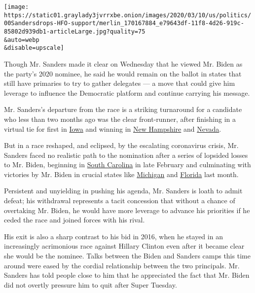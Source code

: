 \texttt{[image: https://static01.graylady3jvrrxbe.onion/images/2020/03/10/us/politics/00Sandersdrops-HFO-support/merlin\_170167884\_e79643df-11f8-4d26-919c-85802d939db1-articleLarge.jpg?quality=75\\\&auto=webp\\\&disable=upscale]}

Though Mr. Sanders made it clear on Wednesday that he viewed Mr. Biden
as the party's 2020 nominee, he said he would remain on the ballot in
states that still have primaries to try to gather delegates --- a move
that could give him leverage to influence the Democratic platform and
continue carrying his message.

Mr. Sanders's departure from the race is a striking turnaround for a
candidate who less than two months ago was the clear front-runner, after
finishing in a virtual tie for first in
\href{https://www.nytimes3xbfgragh.onion/2020/02/07/us/politics/who-won-iowa-caucuses.html}{Iowa}
and winning in
\href{https://www.nytimes3xbfgragh.onion/2020/02/11/us/politics/bernie-sanders-new-hampshire-primary.html}{New
Hampshire} and
\href{https://www.nytimes3xbfgragh.onion/2020/02/22/us/politics/bernie-sanders-nevada-caucus.html}{Nevada}.

But in a race reshaped, and eclipsed, by the escalating coronavirus
crisis, Mr. Sanders faced no realistic path to the nomination after a
series of lopsided losses to Mr. Biden, beginning in
\href{https://www.nytimes3xbfgragh.onion/2020/02/29/us/politics/joe-biden-south-carolina-primary.html}{South
Carolina} in late February and culminating with victories by Mr. Biden
in crucial states like
\href{https://www.nytimes3xbfgragh.onion/2020/03/10/us/politics/michigan-primary-results.html}{Michigan}
and
\href{https://www.nytimes3xbfgragh.onion/2020/03/17/us/politics/biden-florida-illinois-primary.html}{Florida}
last month.

Persistent and unyielding in pushing his agenda, Mr. Sanders is loath to
admit defeat; his withdrawal represents a tacit concession that without
a chance of overtaking Mr. Biden, he would have more leverage to advance
his priorities if he ceded the race and joined forces with his rival.

His exit is also a sharp contrast to his bid in 2016, when he stayed in
an increasingly acrimonious race against Hillary Clinton even after it
became clear she would be the nominee. Talks between the Biden and
Sanders camps this time around were eased by the cordial relationship
between the two principals. Mr. Sanders has told people close to him
that he appreciated the fact that Mr. Biden did not overtly pressure him
to quit after Super Tuesday.

